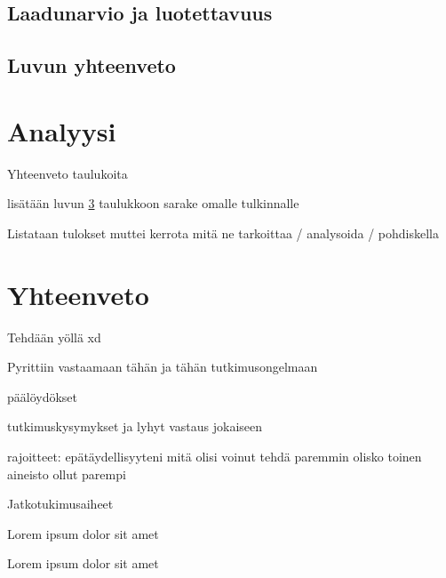 \documentclass[bscthesis,finnish,oneside,biblatex]{uefcsthesis}
\begin{document}
\section{Laadunarvio ja luotettavuus}

\section{Luvun yhteenveto}

\chapter{Analyysi}
\label{cha:analyysi}

Yhteenveto taulukoita

lisätään luvun \ref{cha:analyysi} taulukkoon sarake omalle tulkinnalle

Listataan tulokset muttei kerrota mitä ne tarkoittaa / analysoida / pohdiskella


\chapter{Yhteenveto}
\label{cha:yhteenveto}

Tehdään yöllä xd

Pyrittiin vastaamaan tähän ja tähän tutkimusongelmaan

päälöydökset

tutkimuskysymykset ja lyhyt vastaus jokaiseen

rajoitteet:
epätäydellisyyteni
mitä olisi voinut tehdä paremmin
olisko toinen aineisto ollut parempi

Jatkotukimusaiheet

Lorem ipsum dolor sit amet\citep{zafari2019survey}

\citet{zafari2019survey} Lorem ipsum dolor sit amet

\printbibliography[heading=bibintoc]

\backmatter %
\end{document}
